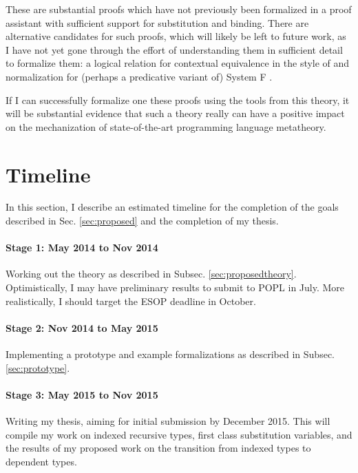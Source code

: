 \documentclass{article}
\begin{document}
These are substantial proofs which have not previously been
formalized in a proof assistant with sufficient support for
substitution and binding. There are alternative candidates for such
proofs, which will likely be left to future work, as I have not yet
gone through the effort of understanding them in sufficient detail to
formalize them: a logical relation
for contextual equivalence in the style of
\cite{Dreyer11} and normalization for (perhaps a predicative variant
of) System F \citep{ProofsAndTypes,Altenkirch93}.

If I can successfully formalize one these proofs using the tools from
this theory, it will be substantial evidence that such a theory really
can have a positive impact on the mechanization of state-of-the-art
programming language metatheory.


\section{Timeline}
In this section, I describe an estimated timeline for the completion
of the goals described in Sec. \ref{sec:proposed} and the
completion of my thesis.

\paragraph{Stage 1:  May 2014 to Nov 2014} Working out the
theory as described in Subsec. \ref{sec:proposedtheory}. Optimistically, I may have preliminary results to submit
to POPL in July. More realistically, I should target the ESOP deadline in October.

\paragraph{Stage 2: Nov 2014 to May 2015} Implementing a prototype and
example formalizations as described in Subsec. \ref{sec:prototype}.

\paragraph{Stage 3: May 2015 to Nov 2015} Writing my thesis, aiming for initial submission by
December 2015. This will compile my work on indexed recursive types, first class substitution
variables, and the results of my proposed work on the transition from indexed types
to dependent types.
\end{document}

